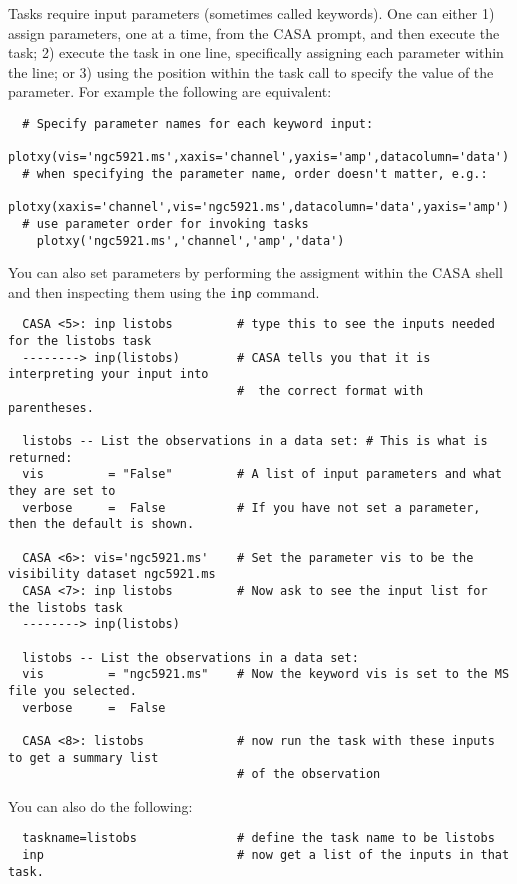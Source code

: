 Tasks require input parameters (sometimes called keywords).  One can
either 1) assign parameters, one at a time, from the CASA prompt, and
then execute the task; 2) execute the task in one line, specifically
assigning each parameter within the line; or 3) using the position
within the task call to specify the value of the parameter.  For
example the following are equivalent:

\small
\begin{verbatim}
  # Specify parameter names for each keyword input: 
    plotxy(vis='ngc5921.ms',xaxis='channel',yaxis='amp',datacolumn='data')
  # when specifying the parameter name, order doesn't matter, e.g.:
    plotxy(xaxis='channel',vis='ngc5921.ms',datacolumn='data',yaxis='amp')
  # use parameter order for invoking tasks
    plotxy('ngc5921.ms','channel','amp','data')
\end{verbatim}
\normalsize

You can also set parameters by performing the assigment within the
CASA shell and then inspecting them using the {\tt inp} command. 

\small
\begin{verbatim}
  CASA <5>: inp listobs         # type this to see the inputs needed for the listobs task
  --------> inp(listobs)        # CASA tells you that it is interpreting your input into
                                #  the correct format with parentheses.  

  listobs -- List the observations in a data set: # This is what is returned: 
  vis         = "False"         # A list of input parameters and what they are set to
  verbose     =  False          # If you have not set a parameter, then the default is shown. 

  CASA <6>: vis='ngc5921.ms'    # Set the parameter vis to be the visibility dataset ngc5921.ms
  CASA <7>: inp listobs         # Now ask to see the input list for the listobs task
  --------> inp(listobs)

  listobs -- List the observations in a data set:
  vis         = "ngc5921.ms"    # Now the keyword vis is set to the MS file you selected.  
  verbose     =  False

  CASA <8>: listobs             # now run the task with these inputs to get a summary list
                                # of the observation 
\end{verbatim}
\normalsize

You can also do the following: 
\small
\begin{verbatim}
  taskname=listobs              # define the task name to be listobs
  inp                           # now get a list of the inputs in that task. 
\end{verbatim}
\normalsize


